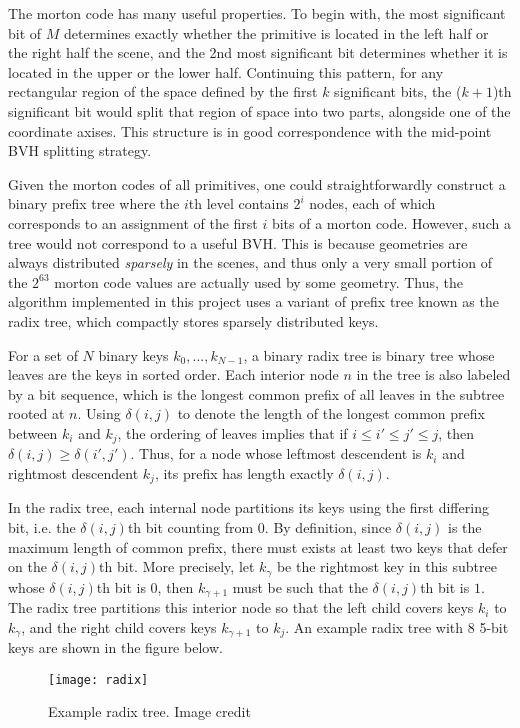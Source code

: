 \newpage
\thispagestyle{empty}
\enlargethispage{5\baselineskip}

The morton code has many useful properties. To begin with, the most significant bit of $M$ determines exactly whether the primitive is located in the left half or the right half the scene, and the 2nd most significant bit determines whether it is located in the upper or the lower half. Continuing this pattern, for any rectangular region of the space defined by the first $k$ significant bits, the ($k+1$)th significant bit would split that region of space into two parts, alongside one of the coordinate axises. This structure is in good correspondence with the mid-point BVH splitting strategy.


Given the morton codes of all primitives, one could straightforwardly construct a binary prefix tree where the $i$th level contains $2^i$ nodes, each of which corresponds to an assignment of the first $i$ bits of a morton code. However, such a tree would not correspond to a useful BVH. This is because geometries are always distributed \textit{sparsely} in the scenes, and thus only a very small portion of the $2^{63}$ morton code values are actually used by some geometry. Thus, the algorithm\cite{bvh_build} implemented in this project uses a variant of prefix tree known as the radix tree, which compactly stores sparsely distributed keys.

For a set of $N$ binary keys $k_0,...,k_{N-1}$, a binary radix tree is binary tree whose leaves are the keys in sorted order. Each interior node $n$ in the tree is also labeled by a bit sequence, which is the longest common prefix of all leaves in the subtree rooted at $n$. Using $\delta(i,j)$ to denote the length of the longest common prefix between $k_i$ and $k_j$, the ordering of leaves implies that if $i\leq i'\leq j'\leq j$, then $\delta(i,j)\geq \delta(i',j')$. Thus, for a node whose leftmost descendent is $k_i$ and rightmost descendent $k_j$, its prefix has length exactly $\delta(i,j)$. 


In the radix tree, each internal node partitions its keys using the first differing bit, i.e. the $\delta(i,j)$th bit counting from 0. By definition, since $\delta(i,j)$ is the maximum length of common prefix, there must exists at least two keys that defer on the $\delta(i,j)$th bit. More precisely, let $k_{\gamma}$ be the rightmost key in this subtree whose $\delta(i,j)$th bit is $0$, then $k_{\gamma+1}$ must be such that the $\delta(i,j)$th bit is $1$. The radix tree partitions this interior node so that the left child covers keys $k_i$ to $k_\gamma$, and the right child covers keys $k_{\gamma+1}$ to $k_{j}$. An example radix tree with 8 5-bit keys are shown in the figure below.
\begin{figure}[H]
    \centering
    \texttt{[image: radix]}
    \caption{Example radix tree. Image credit \cite{bvh_build}}
    \label{image radix tree}
\end{figure} 


